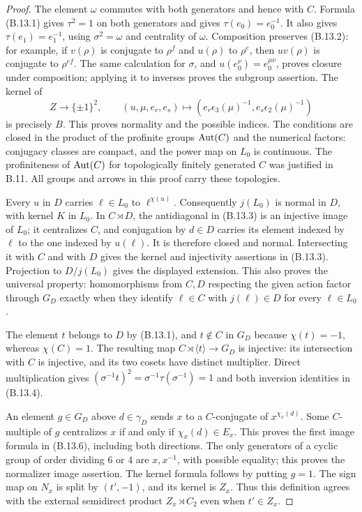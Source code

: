 \begin{proof}
The element $\omega$ commutes with both generators and hence with $C$.
Formula (B.13.1) gives $\tau^2=1$ on both generators and gives
$\tau(e_0)=e_0^{-1}$. It also gives $\tau(e_1)=e_1^{-1}$, using
$\sigma^2=\omega$ and centrality of $\omega$.
Composition preserves (B.13.2): for example, if $v(\rho)$ is conjugate
to $\rho^f$ and $u(\rho)$ to $\rho^e$, then $uv(\rho)$ is conjugate
to $\rho^{ef}$. The same calculation for $\sigma$, and
$u(e_0^\nu)=e_0^{\mu\nu}$, proves closure under composition;
applying it to inverses proves the subgroup assertion.
The kernel of
\[
 Z\longrightarrow\{\pm1\}^2,
 \qquad (u,\mu,e_r,e_s)\longmapsto
       (e_r\epsilon_3(\mu)^{-1},e_s\epsilon_2(\mu)^{-1})
\]
is precisely $B$. This proves normality and the possible indices.
The conditions are closed in the product of the profinite groups
$\operatorname{Aut}(C)$ and the numerical factors: conjugacy classes are compact,
and the power map on $L_0$ is continuous. The profiniteness of
$\operatorname{Aut}(C)$ for topologically finitely generated $C$ was justified in
B.11. All groups and arrows in this proof carry these topologies.

Every $u$ in $D$ carries $\ell\in L_0$ to $\ell^{\chi(u)}$.
Consequently $j(L_0)$ is normal in $D$, with kernel $K$ in $L_0$.
In $C\rtimes D$, the antidiagonal in (B.13.3) is an injective image
of $L_0$; it centralizes $C$, and conjugation by $d\in D$ carries
its element indexed by $\ell$ to the one indexed by $u(\ell)$.
It is therefore closed and normal. Intersecting it with $C$ and
with $D$ gives the kernel and injectivity assertions in (B.13.3).
Projection to $D/j(L_0)$ gives the displayed extension. This also
proves the universal property: homomorphisms from $C,D$ respecting
the given action factor through $G_D$ exactly when they identify
$\ell\in C$ with $j(\ell)\in D$ for every $\ell\in L_0$.

The element $t$ belongs to $D$ by (B.13.1), and $t\notin C$ in
$G_D$ because $\chi(t)=-1$, whereas $\chi(C)=1$.
The resulting map $C\rtimes\langle t\rangle\to G_D$ is injective:
its intersection with $C$ is injective, and its two cosets have
distinct multiplier. Direct multiplication gives
$(\sigma^{-1}t)^2=\sigma^{-1}\tau(\sigma^{-1})=1$ and both
inversion identities in (B.13.4).

An element $g\in G_D$ above $d\in\gamma_D$ sends $x$ to a
$C$-conjugate of $x^{\chi_x(d)}$. Some $C$-multiple of $g$
centralizes $x$ if and only if $\chi_x(d)\in E_x$.
This proves the first image formula in (B.13.6), including both
directions. The only generators of a cyclic group of order dividing
$6$ or $4$ are $x,x^{-1}$, with possible equality; this proves the
normalizer image assertion. The kernel formula follows by putting
$g=1$. The sign map on $N_x$ is split by $(t',-1)$, and its kernel
is $Z_x$. Thus this definition agrees with the external semidirect
product $Z_x\rtimes C_2$ even when $t'\in Z_x$.


\end{proof}
